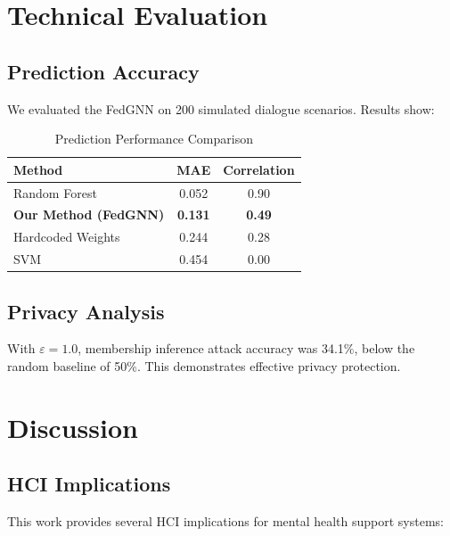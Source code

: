 \documentclass[preprint,12pt]{elsarticle}
\begin{document}
\section{Technical Evaluation}

\subsection{Prediction Accuracy}

We evaluated the FedGNN on 200 simulated dialogue scenarios. Results show:

\begin{table}[h]
\centering
\caption{Prediction Performance Comparison}
\begin{tabular}{lcc}
\toprule
Method & MAE & Correlation \\
\midrule
Random Forest & 0.052 & 0.90 \\
\textbf{Our Method (FedGNN)} & \textbf{0.131} & \textbf{0.49} \\
Hardcoded Weights & 0.244 & 0.28 \\
SVM & 0.454 & 0.00 \\
\bottomrule
\end{tabular}
\end{table}

\subsection{Privacy Analysis}

With $\varepsilon=1.0$, membership inference attack accuracy was 34.1\%,
below the random baseline of 50\%. This demonstrates effective privacy protection.

\section{Discussion}

\subsection{HCI Implications}

This work provides several HCI implications for mental health support systems:
\end{document}
